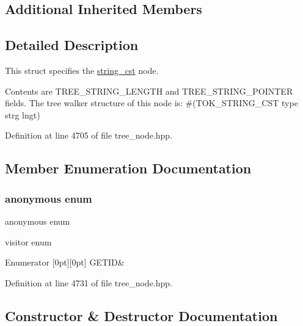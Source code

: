 \subsection*{Additional Inherited Members}


\subsection{Detailed Description}
This struct specifies the \hyperlink{structstring__cst}{string\+\_\+cst} node. 

Contents are T\+R\+E\+E\+\_\+\+S\+T\+R\+I\+N\+G\+\_\+\+L\+E\+N\+G\+TH and T\+R\+E\+E\+\_\+\+S\+T\+R\+I\+N\+G\+\_\+\+P\+O\+I\+N\+T\+ER fields. The tree walker structure of this node is\+: \#(T\+O\+K\+\_\+\+S\+T\+R\+I\+N\+G\+\_\+\+C\+ST type strg lngt) 

Definition at line 4705 of file tree\+\_\+node.\+hpp.



\subsection{Member Enumeration Documentation}
\mbox{\label{structstring__cst_a72d3d2ed69fd793869b45df063270634}} 
\subsubsection{\texorpdfstring{anonymous enum}{anonymous enum}}
{\footnotesize\ttfamily anonymous enum}



visitor enum 

\begin{DoxyEnumFields}{Enumerator}
[0pt][0pt]{}\mbox{\label{structstring__cst_a72d3d2ed69fd793869b45df063270634af4049bb81f8f63c92d9a1bc914f6debf}} 
G\+E\+T\+ID&\\
\hline

\end{DoxyEnumFields}


Definition at line 4731 of file tree\+\_\+node.\+hpp.



\subsection{Constructor \& Destructor Documentation}
\mbox{\label{structstring__cst_ace745118d10298bc90d2531dfdf34eee}} 
